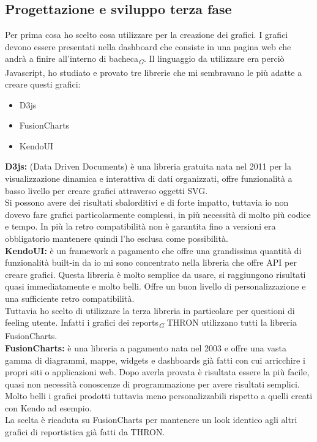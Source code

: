 \documentclass[a4paper, 12pt, twoside, openright]{book}
\newcommand{\gloss}[1]{#1\textsubscript{\textit{\tiny{G}}}}
\begin{document}
\subsection{Progettazione e sviluppo terza fase}
Per prima cosa ho scelto cosa utilizzare per la creazione dei grafici. I grafici devono essere presentati nella dashboard che consiste in una pagina web che andrà a finire all'interno di \gloss{bacheca}. Il linguaggio da utilizzare era perciò Javascript, ho studiato e provato tre librerie che mi sembravano le più adatte a creare questi grafici:
\begin{itemize}
	\item D3js
	\item FusionCharts
	\item KendoUI
\end{itemize}
\textbf{D3js:} (Data Driven Documents) è una libreria gratuita nata nel 2011 per la visualizzazione dinamica e interattiva di dati organizzati, offre funzionalità a basso livello per creare grafici attraverso oggetti SVG.\\
Si possono avere dei risultati sbalorditivi e di forte impatto, tuttavia io non dovevo fare grafici particolarmente complessi, in più necessità di molto più codice e tempo. In più la retro compatibilità non è garantita fino a versioni era obbligatorio mantenere quindi l'ho esclusa come possibilità.\\
\textbf{KendoUI:} è un framework a pagamento che offre una grandissima quantità di funzionalità built-in da io mi sono concentrato nella libreria che offre API per creare grafici. Questa libreria è molto semplice da usare, si raggiungono risultati quasi immediatamente e molto belli. Offre un buon livello di personalizzazione e una sufficiente retro compatibilità.\\
Tuttavia ho scelto di utilizzare la terza libreria in particolare per questioni di feeling utente. Infatti i grafici dei \gloss{reports} THRON utilizzano tutti la libreria FusionCharts.\\
\textbf{FusionCharts:} è una libreria a pagamento  nata nel 2003 e offre una vasta gamma di diagrammi, mappe, widgets e dashboards già fatti con cui arricchire i propri siti o applicazioni web. Dopo averla provata è risultata essere la più facile, quasi non necessità conoscenze di programmazione per avere risultati semplici. Molto belli i grafici prodotti tuttavia meno personalizzabili rispetto a quelli creati con Kendo ad esempio.\\
La scelta è ricaduta su FusionCharts per mantenere un look identico agli altri grafici di reportistica già fatti da THRON.\\
\end{document}
